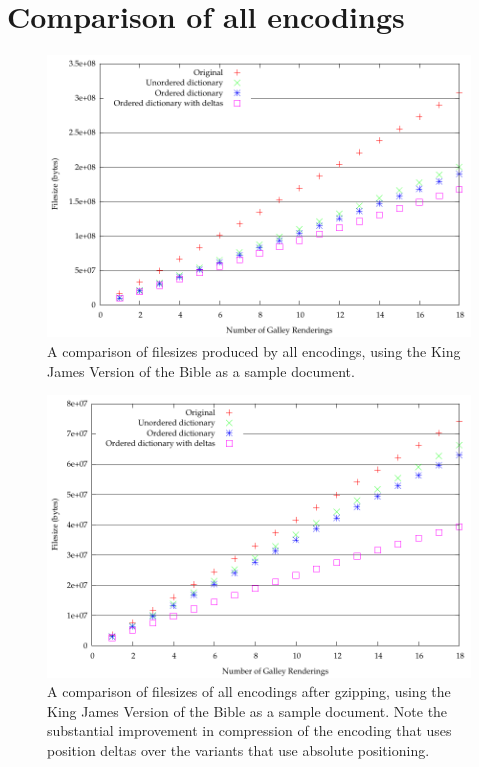 \section{Comparison of all encodings}

\begin{figure}
  \begin{center}
  \includegraphics[width=\textwidth]{gnuplot/kjv-b}
  \end{center}
  \caption[Comparison of filesizes from all encodings]{A comparison of filesizes produced by all encodings, using the King James Version of the Bible as a sample document.}
  \label{fig:size-all-b}
\end{figure}

\begin{figure}
  \begin{center}
  \includegraphics[width=\textwidth]{gnuplot/kjv-gz}
  \end{center}
  \caption[Comparison of gzipped filesizes from all encodings]{A comparison of filesizes of all encodings after gzipping, using the King James Version of the Bible as a sample document. Note the substantial improvement in compression of the encoding that uses position deltas over the variants that use absolute positioning.}
  \label{fig:size-all-gz}
\end{figure}


